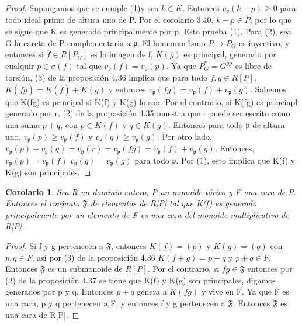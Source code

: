 \documentclass[12pt,spanish]{amsart}
\newcommand{\fk}[1]{\mathfrak{#1}}
\newtheorem{cor}[Theorem]{Corolario}
\theoremstyle{definition}
\theoremstyle{remark}
\begin{document}
\begin{proof}
Supongamos que se cumple (1)y sea $k\in K$. Entonces $v_{\fk{p}}(k-p) \geq 0$ para todo ideal primo de altura uno de P. Por el corolario 3.40, $k-p\in P$, por lo que se sigue que K es generado principalmente por p. Esto prueba (1). Para (2), sea G la careta de P complementaria a $\fk{p}$. El homomorfismo $P \to P_{G}$ es inyectivo, y entonces si $\overline{f}\in R[P_{G}]$ es la imagen de f, $K(\overline{g})$ es principal, generado por cualquir $p\in \sigma(f)$ tal que $v_{\fk{p}}(f)=v_{\fk{p}}(p)$. Ya que $P_{G}^{\ast}=G^{gp}$ es libre de torsión, (3) de la proposición 4.36 implica que para todo $f,g\in R[P]$, $K(\overline{f}\overline{g})=K(\overline{f})+K(\overline{g})$ y entonces $v_{\fk{p}}(fg)=v_{\fk{p}}(f)+v_{\fk{p}}(g)$. Sabemos que K(fg) es principal si K(f) y K(g) lo son. Por el contrario, si K(fg) es princiapl generado por r, (2) de la proposición 4.35 muestra que r puede ser escrito como una suma $p+q$, con $p\in K(f)$ y $q\in K(g)$. Entonces para todo $\fk{p}$ de altura uno, $v_{\fk{p}}(p) \geq v_{\fk{p}}(f)$ y $v_{\fk{p}}(q) \geq v_{\fk{p}}(g)$. Por otro lado, $v_{\fk{p}}(p)+v_{\fk{p}}(q)=v_{\fk{p}}(r)=v_{\fk{p}}(fg)=v_{\fk{p}}(f)+v_{\fk{p}}(g)$. Entonces, $v_{\fk{p}}(p)=v_{\fk{p}}(f)$  $v_{\fk{p}}(q)=v_{\fk{p}}(g)$ para todo $\fk{p}$. Por (1), esto implica que K(f) y K(g) son principales. 
\end{proof}

\begin{cor}
Sea R un dominio entero, P un monoide tórico y F una cara de P. Entonces el conjunto $\fk{F}$ de elementos de R[P] tal que K(f) es generado principalmente por un elemento de F es una cara del monoide multiplicativo de R[P]. 
\end{cor}

\begin{proof}
Si f y g pertenecen a $\fk{F}$, entonces $K(f)=(p)$ y $K(g)=(q)$ con $p,q \in F$, así por (3) de la proposición 4.36 $K(f+g)=p+q$ y $p+q \in F$. Entonces $\fk{F}$ es un submonoide de $R[P]$. Por el contrario, si $fg\in \fk{F}$ entonces por (2) de la proposición 4.37 se tiene que K(f) y K(g) son principales, digamos generados por p y q. Entonces $p+q$ genera a $K(fg)$ y vive en F. Ya que F es una cara, p y q pertenecen a F, y entonces f y g pertenecen a $\fk{F}$. Entonces $\fk{F}$ es una cara de R[P]. 
\end{proof}
\end{document}
